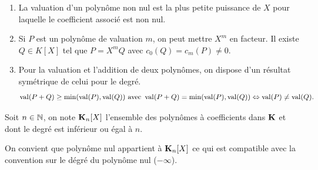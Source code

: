 \begin{rems}
\begin{enumerate}
 \item La valuation d'un polynôme non nul est la plus petite puissance de $X$ pour laquelle le coefficient associé est non nul.
 \item Si $P$ est un polynôme de valuation $m$, on peut mettre $X^m$ en facteur. Il existe $Q\in K[X]$ tel que $P=X^mQ$ avec $c_0(Q)=c_m(P)\neq 0$.
 \item Pour la valuation et l'addition de deux polynômes, on dispose d'un résultat symétrique de celui pour le degré.
\[
 \mathop{\mathrm{val}}(P+Q) \geq \min(\mathop{\mathrm{val}}(P), \mathop{\mathrm{val}}(Q)) \text{ avec } \mathop{\mathrm{val}}(P+Q) = \min(\mathop{\mathrm{val}}(P), \mathop{\mathrm{val}}(Q)) \Leftrightarrow \mathop{\mathrm{val}}(P) \neq \mathop{\mathrm{val}}(Q).
\]
\end{enumerate}
\end{rems}
\begin{defi}
 Soit $n\in \mathbb{N}$, on note $\mathbf{K}_n[X]$ l'ensemble des polynômes à coefficients dans $\mathbf{K}$ et dont le degré est inférieur ou égal à $n$.
\end{defi}
\begin{rem}
 On convient que polynôme nul appartient à $\mathbf{K}_n[X]$ ce qui est compatible avec la convention sur le dégré du polynôme nul ($-\infty$).
\end{rem}

